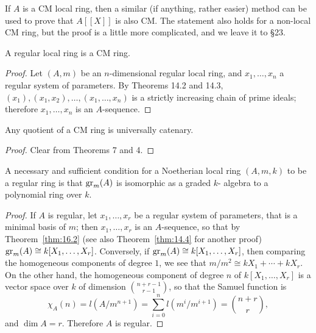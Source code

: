 \begin{remark}
If $A$ is a CM local ring, then a similar (if anything, rather easier)
method can be used to prove that $A[[X]]$ is also CM. The statement also
holds for a non-local CM ring, but the proof is a little more complicated,
and we leave it to \S23.
\end{remark}

\begin{theorem}\label{thm:17.8}
A regular local ring is a CM ring.
\end{theorem}

\begin{proof}
Let $(A, m)$ be an $n$-dimensional regular local ring, and $x_1, \ldots, x_n$ a
regular system of parameters. By Theorems 14.2 and 14.3, $(x_1), (x_1, x_2), \ldots,
(x_1, \ldots, x_n)$ is a strictly increasing chain of prime ideals; therefore $x_1, \ldots, x_n$
is an $A$-sequence.
\end{proof}

\begin{theorem}\label{thm:17.9}
Any quotient of a CM ring is universally catenary.
\end{theorem}

\begin{proof}
Clear from Theorems 7 and 4.
\end{proof}

\begin{theorem}\label{thm:17.10}
A necessary and sufficient condition for a Noetherian local
ring $(A, m, k)$ to be a regular ring is that $\operatorname{gr}_m(A)$ is isomorphic as a graded $k$-
algebra to a polynomial ring over $k$.
\end{theorem}

\begin{proof}
If $A$ is regular, let $x_1, \ldots, x_r$ be a regular system of parameters, that
is a minimal basis of $m$; then $x_1, \ldots, x_r$ is an $A$-sequence, so that by
Theorem~\ref{thm:16.2} (see also Theorem~\ref{thm:14.4} for another proof) $\operatorname{gr}_m(A) \cong
k[X_1, \ldots, X_r]$. Conversely, if $\operatorname{gr}_m(A) \cong k[X_1, \ldots, X_r]$, then comparing
the homogeneous components of degree $1$, we see that $m/m^2 \cong kX_1
+ \cdots + kX_r$. On the other hand, the homogeneous component of degree $n$
of $k[X_1, \ldots, X_r]$ is a vector space over $k$ of dimension $\binom{n+r-1}{r-1}$,
so that the Samuel function is
\[
  \chi_A(n) = l(A/m^{n+1}) = \sum_{i=0}^{n} l(m^i/m^{i+1}) = \binom{n+r}{r},
\]
and $\dim A = r$. Therefore $A$ is regular.
\end{proof}

